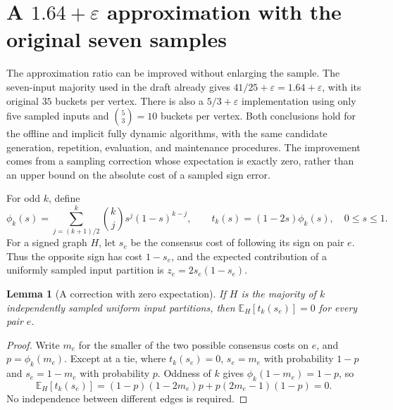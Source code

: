 \documentclass[11pt]{article}
\newtheorem{lemma}[theorem]{Lemma}
\begin{document}
\section{A \texorpdfstring{$1.64+\varepsilon$}{1.64 + epsilon} approximation with the original seven samples}
\label{sec:centered-finite}

The approximation ratio can be improved without enlarging the sample.
The seven-input majority used in the draft already gives
$41/25+\varepsilon=1.64+\varepsilon$, with its original $35$ buckets per
vertex. There is also a $5/3+\varepsilon$ implementation using only five
sampled inputs and $\binom53=10$ buckets per vertex. Both conclusions
hold for the offline and implicit fully dynamic algorithms, with the
same candidate generation, repetition, evaluation, and maintenance
procedures. The improvement comes from a sampling correction whose
expectation is exactly zero, rather than an upper bound on the absolute
cost of a sampled sign error.

For odd $k$, define
\[
 \phi_k(s)=\sum_{j=(k+1)/2}^k\binom kj s^j(1-s)^{k-j},
 \qquad t_k(s)=(1-2s)\phi_k(s),\quad 0\le s\le1.
\]
For a signed graph $H$, let $s_e$ be the consensus cost of following its
sign on pair $e$. Thus the opposite sign has cost $1-s_e$, and the
expected contribution of a uniformly sampled input partition is
$z_e=2s_e(1-s_e)$.

\begin{lemma}[A correction with zero expectation]
\label{lem:centered-zero}
If $H$ is the majority of $k$ independently sampled uniform input
partitions, then $\mathbb E_H[t_k(s_e)]=0$ for every pair $e$.
\end{lemma}
\begin{proof}
Write $m_e$ for the smaller of the two possible consensus costs on
$e$, and $p=\phi_k(m_e)$. Except at a tie, where $t_k(s_e)=0$,
$s_e=m_e$ with probability $1-p$ and $s_e=1-m_e$ with probability $p$.
Oddness of $k$ gives $\phi_k(1-m_e)=1-p$, so
\[
 \mathbb E_H[t_k(s_e)]
 =(1-p)(1-2m_e)p+p(2m_e-1)(1-p)=0.
\]
No independence between different edges is required.
\end{proof}
\end{document}
